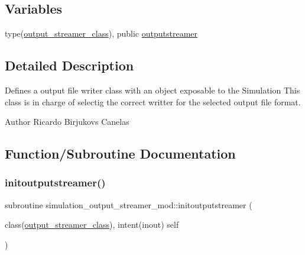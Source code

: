 \subsection*{Variables}
\begin{DoxyCompactItemize}
\item 
type(\mbox{\hyperlink{structsimulation__output__streamer__mod_1_1output__streamer__class}{output\+\_\+streamer\+\_\+class}}), public \mbox{\hyperlink{namespacesimulation__output__streamer__mod_a6b95972f6387d7ce3231af3d25fedac5}{outputstreamer}}
\end{DoxyCompactItemize}


\subsection{Detailed Description}
Defines a output file writer class with an object exposable to the Simulation This class is in charge of selectig the correct writter for the selected output file format. 

\begin{DoxyAuthor}{Author}
Ricardo Birjukovs Canelas 
\end{DoxyAuthor}


\subsection{Function/\+Subroutine Documentation}
\mbox{\label{namespacesimulation__output__streamer__mod_a82c657d25adca9e0353ec9f87a4dd0c9}} 
\subsubsection{\texorpdfstring{initoutputstreamer()}{initoutputstreamer()}}
{\footnotesize\ttfamily subroutine simulation\+\_\+output\+\_\+streamer\+\_\+mod\+::initoutputstreamer (\begin{DoxyParamCaption}\item[{class(\mbox{\hyperlink{structsimulation__output__streamer__mod_1_1output__streamer__class}{output\+\_\+streamer\+\_\+class}}), intent(inout)}]{self }\end{DoxyParamCaption})\hspace{0.3cm}{\ttfamily [private]}}



